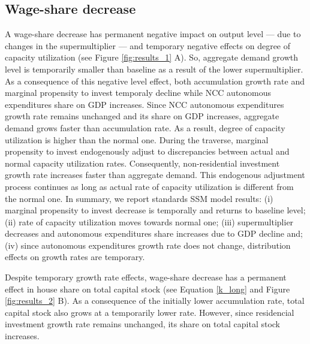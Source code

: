 \documentclass[11pt]{article}
\begin{document}
\subsection{Wage-share decrease}
\label{sec:org7dcd8f7}
\label{sec:Exp1}

A wage-share decrease has permanent negative impact on output level --- due to changes in the supermultiplier --- and temporary negative effects on degree of capacity utilization (see Figure \ref{fig:results_1} A).
So, aggregate demand growth level is temporarily smaller than baseline as a result of the lower supermultiplier.
As a consequence of this negative level effect, both accumulation growth rate and marginal propensity to invest temporaly decline while NCC autonomous expenditures share on GDP increases.
Since NCC autonomous expenditures growth rate remains unchanged and its share on GDP increases, aggregate demand grows faster than accumulation rate.
As a result, degree of capacity utilization is higher than the normal one.
During the traverse, marginal propensity to invest endogenously adjust to discrepancies between actual and normal capacity utilization rates.
Consequently, non-residential investment growth rate increases faster than aggregate demand.
This endogenous adjustment process continues as long as actual rate of capacity utilization is different from the normal one.
In summary, we report standards SSM model results:
    (i) marginal propensity to invest decrease is temporally and returns to baseline level;
    (ii) rate of capacity utilization moves towards normal one;
    (iii) supermultiplier decreases and autonomous expenditures share increases due to GDP decline and; 
    (iv) since autonomous expenditures growth rate does not change, distribution effects on growth rates are temporary. 


Despite temporary growth rate effects, wage-share decrease has a permanent effect in house share on total capital stock (see Equation \ref{k_long} and Figure \ref{fig:results_2} B).
As a consequence of the initially lower accumulation rate, total capital stock also grows at a temporarily lower rate.
However, since residencial investment growth rate remains unchanged, its share on total capital stock increases.
\end{document}

